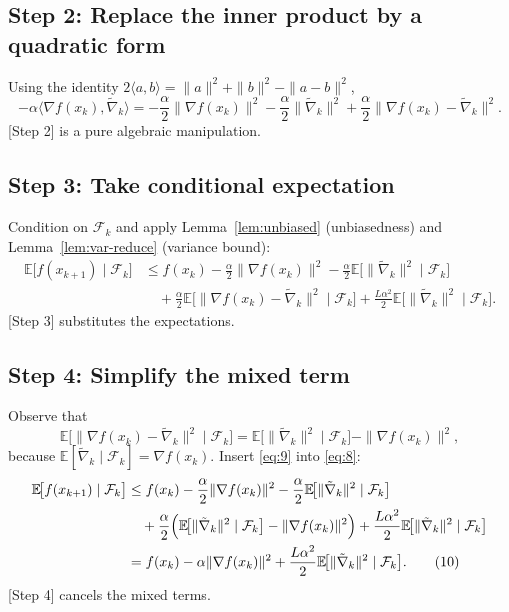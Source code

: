 \documentclass{article}
\begin{document}
\subsection*{Step 2: Replace the inner product by a quadratic form}
Using the identity $2\langle a,b\rangle = \|a\|^{2}+\|b\|^{2}-\|a-b\|^{2}$,
\[
-\alpha\langle\nabla f(x_k),\tilde\nabla_k\rangle
= -\frac{\alpha}{2}\|\nabla f(x_k)\|^{2}
  -\frac{\alpha}{2}\|\tilde\nabla_k\|^{2}
  +\frac{\alpha}{2}\|\nabla f(x_k)-\tilde\nabla_k\|^{2}.
\tag{7}
\]
[Step 2] is a pure algebraic manipulation.

\subsection*{Step 3: Take conditional expectation}
Condition on $\mathcal{F}_k$ and apply Lemma~\ref{lem:unbiased} (unbiasedness) and Lemma~\ref{lem:var-reduce} (variance bound):
\begin{align}
\mathbb{E}\!\bigl[f(x_{k+1})\mid\mathcal{F}_k\bigr]
&\le f(x_k)-\frac{\alpha}{2}\|\nabla f(x_k)\|^{2}
   -\frac{\alpha}{2}\mathbb{E}\!\bigl[\|\tilde\nabla_k\|^{2}\mid\mathcal{F}_k\bigr]\nonumber\\
&\quad +\frac{\alpha}{2}\mathbb{E}\!\bigl[\|\nabla f(x_k)-\tilde\nabla_k\|^{2}\mid\mathcal{F}_k\bigr]
   +\frac{L\alpha^{2}}{2}\mathbb{E}\!\bigl[\|\tilde\nabla_k\|^{2}\mid\mathcal{F}_k\bigr].
\tag{8}
\end{align}
[Step 3] substitutes the expectations.

\subsection*{Step 4: Simplify the mixed term}
Observe that
\[
\mathbb{E}\!\bigl[\|\nabla f(x_k)-\tilde\nabla_k\|^{2}\mid\mathcal{F}_k\bigr]
 =\mathbb{E}\!\bigl[\|\tilde\nabla_k\|^{2}\mid\mathcal{F}_k\bigr]
   -\|\nabla f(x_k)\|^{2},
\tag{9}
\]
because $\mathbb{E}[\tilde\nabla_k\mid\mathcal{F}_k]=\nabla f(x_k)$.
Insert \eqref{eq:9} into \eqref{eq:8}:
\begin{align}
\mathbb{E}\!\bigl[f(x_{k+1})\mid\mathcal{F}_k\bigr]
&\le f(x_k)-\frac{\alpha}{2}\|\nabla f(x_k)\|^{2}
   -\frac{\alpha}{2}\mathbb{E}\!\bigl[\|\tilde\nabla_k\|^{2}\mid\mathcal{F}_k\bigr]\nonumber\\
&\quad +\frac{\alpha}{2}\Bigl(\mathbb{E}\!\bigl[\|\tilde\nabla_k\|^{2}\mid\mathcal{F}_k\bigr]-\|\nabla f(x_k)\|^{2}\Bigr)
   +\frac{L\alpha^{2}}{2}\mathbb{E}\!\bigl[\|\tilde\nabla_k\|^{2}\mid\mathcal{F}_k\bigr]\nonumber\\
&= f(x_k)-\alpha\|\nabla f(x_k)\|^{2}
   +\frac{L\alpha^{2}}{2}\mathbb{E}\!\bigl[\|\tilde\nabla_k\|^{2}\mid\mathcal{F}_k\bigr].
\tag{10}
\end{align}
[Step 4] cancels the mixed terms.
\end{document}
